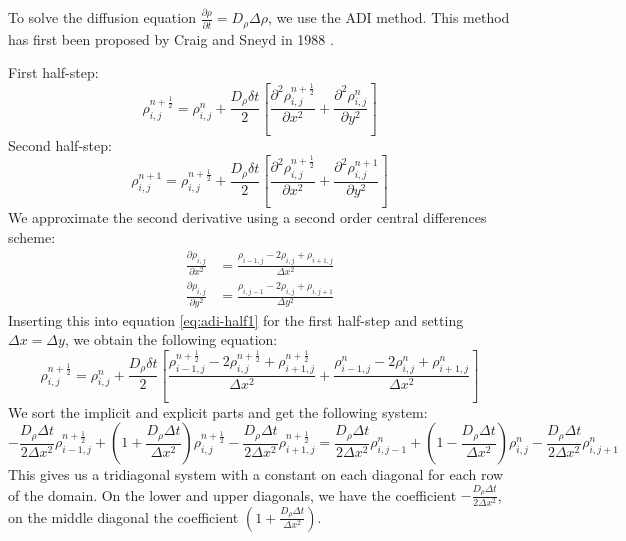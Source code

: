 \documentclass[a4paper]{article}
\begin{document}
To solve the diffusion equation $\frac{\partial \rho}{\partial t} = D_\rho \Delta \rho$, we use the ADI method.
This method has first been proposed by Craig and Sneyd in 1988 \cite{Craig_Sneyd_1988}.

First half-step:
\begin{equation}
	\rho_{i,j}^{n+\frac{1}{2}} = \rho_{i,j}^n + \frac{D_\rho \delta t}{2} \left[ \frac{\partial^2 \rho_{i,j}^{n+\frac{1}{2}}}{\partial x^2} + \frac{\partial^2 \rho_{i,j}^n}{\partial y^2} \right]
	\label{eq:adi-half1}
\end{equation}
Second half-step:
\begin{equation}
	\rho_{i,j}^{n+1} = \rho_{i,j}^{n+\frac{1}{2}} + \frac{D_\rho \delta t}{2} \left[ \frac{\partial^2 \rho_{i,j}^{n+\frac{1}{2}}}{\partial x^2} + \frac{\partial^2 \rho_{i,j}^{n+1}}{\partial y^2} \right]
	\label{eq:adi-half2}
\end{equation}
We approximate the second derivative using a second order central differences scheme:
\begin{align}
	\frac{\partial \rho_{i,j}}{\partial x^2} &= \frac{\rho_{i-1,j} - 2 \rho_{i,j} + \rho_{i+1,j}}{\Delta x^2} \\
	\frac{\partial \rho_{i,j}}{\partial y^2} &= \frac{\rho_{i,j-1} - 2 \rho_{i,j} + \rho_{i,j+1}}{\Delta y^2}
\end{align}
Inserting this into equation \ref{eq:adi-half1} for the first half-step and setting $\Delta x = \Delta y$, we obtain the following equation:
\begin{equation}
	\rho_{i,j}^{n+\frac{1}{2}} = \rho_{i,j}^n + \frac{D_\rho \delta t}{2} \left[ \frac{\rho_{i-1,j}^{n+\frac{1}{2}} - 2 \rho_{i,j}^{n+\frac{1}{2}} + \rho_{i+1,j}^{n+\frac{1}{2}}}{\Delta x^2} + \frac{\rho_{i-1,j}^n - 2 \rho_{i,j}^n + \rho_{i+1,j}^n}{\Delta x^2} \right]
\end{equation}
We sort the implicit and explicit parts and get the following system:
\begin{equation}
	-\frac{D_\rho \Delta t}{2 \Delta x^2} \rho_{i-1,j}^{n + \frac{1}{2}} + \left( 1 + \frac{D_\rho \Delta t}{\Delta x^2} \right) \rho_{i,j}^{n + \frac{1}{2}} - \frac{D_\rho \Delta t}{2 \Delta x^2} \rho_{i+1,j}^{n + \frac{1}{2}} 
	= \frac{D_\rho \Delta t}{2 \Delta x^2} \rho_{i,j-1}^n + \left( 1 - \frac{D_\rho \Delta t}{\Delta x^2} \right) \rho_{i,j}^n - \frac{D_\rho \Delta t}{2 \Delta x^2} \rho_{i,j+1}^n
\end{equation}
This gives us a tridiagonal system with a constant on each diagonal for each row of the domain.
On the lower and upper diagonals, we have the coefficient $-\frac{D_\rho \Delta t}{2 \Delta x^2}$, on the middle diagonal the coefficient $\left( 1 + \frac{D_\rho \Delta t}{\Delta x^2} \right)$.
\end{document}
